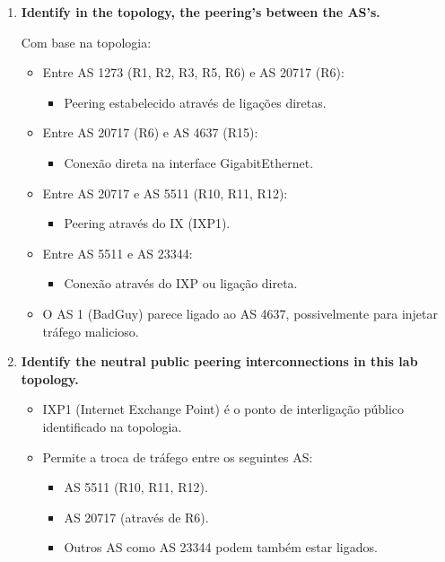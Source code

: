 \documentclass[11pt,english, openright, oneside]{book}
\begin{document}
\begin{enumerate}
  \item \textbf{Identify in the topology, the peering’s between the AS’s.} 
  \vspace{0.2cm}

  Com base na topologia:
  \vspace{0.2cm}

  \begin{itemize}
    \item Entre AS 1273 (R1, R2, R3, R5, R6) e AS 20717 (R6):
    \begin{itemize}
      \item Peering estabelecido através de ligações diretas.
    \end{itemize}
    \item Entre AS 20717 (R6) e AS 4637 (R15):
    \begin{itemize}
      \item Conexão direta na interface GigabitEthernet.
    \end{itemize}
    \item Entre AS 20717 e AS 5511 (R10, R11, R12):
    \begin{itemize}
      \item Peering através do IX (IXP1).
    \end{itemize}
    \item Entre AS 5511 e AS 23344:
    \begin{itemize}
      \item Conexão através do IXP ou ligação direta.
    \end{itemize}
    \item O AS 1 (BadGuy) parece ligado ao AS 4637, possivelmente para injetar tráfego malicioso.
  \end{itemize}
  \vspace{0.2cm}
  \item \textbf{Identify the neutral public peering interconnections in this lab topology.} 
  \vspace{0.2cm}

  \begin{itemize}
    \item IXP1 (Internet Exchange Point) é o ponto de interligação público identificado na topologia.
    \item Permite a troca de tráfego entre os seguintes AS:
    \begin{itemize}
      \item AS 5511 (R10, R11, R12).
      \item AS 20717 (através de R6).
      \item Outros AS como AS 23344 podem também estar ligados.
    \end{itemize}
  \end{itemize}
\end{enumerate}
\end{document}
